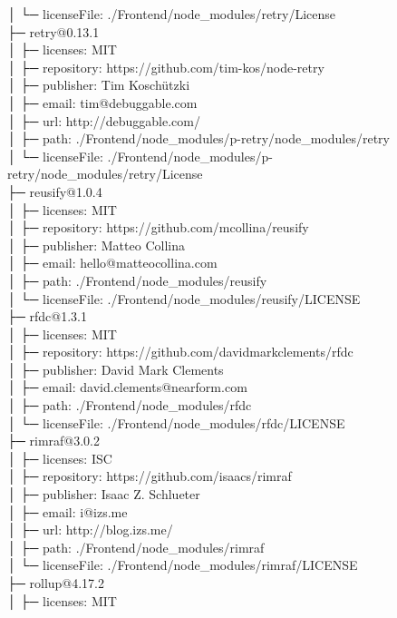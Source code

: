 │  └─ licenseFile: ./Frontend/node\_modules/retry/License\\
├─ retry@0.13.1\\
│  ├─ licenses: MIT\\
│  ├─ repository: https://github.com/tim-kos/node-retry\\
│  ├─ publisher: Tim Koschützki\\
│  ├─ email: tim@debuggable.com\\
│  ├─ url: http://debuggable.com/\\
│  ├─ path: ./Frontend/node\_modules/p-retry/node\_modules/retry\\
│  └─ licenseFile: ./Frontend/node\_modules/p-retry/node\_modules/retry/License\\
├─ reusify@1.0.4\\
│  ├─ licenses: MIT\\
│  ├─ repository: https://github.com/mcollina/reusify\\
│  ├─ publisher: Matteo Collina\\
│  ├─ email: hello@matteocollina.com\\
│  ├─ path: ./Frontend/node\_modules/reusify\\
│  └─ licenseFile: ./Frontend/node\_modules/reusify/LICENSE\\
├─ rfdc@1.3.1\\
│  ├─ licenses: MIT\\
│  ├─ repository: https://github.com/davidmarkclements/rfdc\\
│  ├─ publisher: David Mark Clements\\
│  ├─ email: david.clements@nearform.com\\
│  ├─ path: ./Frontend/node\_modules/rfdc\\
│  └─ licenseFile: ./Frontend/node\_modules/rfdc/LICENSE\\
├─ rimraf@3.0.2\\
│  ├─ licenses: ISC\\
│  ├─ repository: https://github.com/isaacs/rimraf\\
│  ├─ publisher: Isaac Z. Schlueter\\
│  ├─ email: i@izs.me\\
│  ├─ url: http://blog.izs.me/\\
│  ├─ path: ./Frontend/node\_modules/rimraf\\
│  └─ licenseFile: ./Frontend/node\_modules/rimraf/LICENSE\\
├─ rollup@4.17.2\\
│  ├─ licenses: MIT\\
